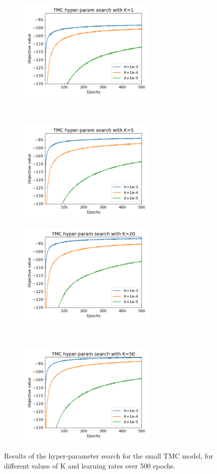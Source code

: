 \begin{figure}[th!]
    \centering
    \begin{subfigure}[t]{0.5\textwidth}
    \hspace*{-2cm}
        \centering
        \includegraphics[height=5cm]{Figures/hp_s_1.png}
    \end{subfigure}%
    ~ 
    \begin{subfigure}[t]{0.5\textwidth}
        \centering
        \includegraphics[height=5cm]{Figures/hp_s_5.png}
    \end{subfigure}
        \begin{subfigure}[t]{0.5\textwidth}
    \hspace*{-2cm}
        \centering
        \includegraphics[height=5cm]{Figures/hp_s_20.png}
    \end{subfigure}%
    ~ 
    \begin{subfigure}[t]{0.5\textwidth}
        \centering
        \includegraphics[height=5cm]{Figures/hp_s_50.png}
    \end{subfigure}
    \caption{Results of the hyper-parameter search for the small TMC model, for different values of K and learning rates over 500 epochs.}
    \label{fig:hp_search}
\end{figure}

